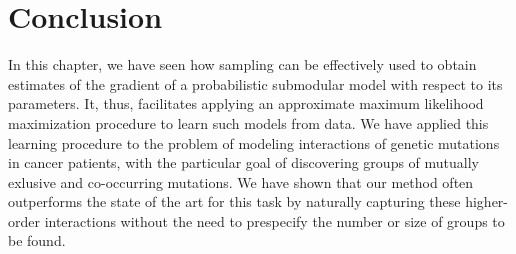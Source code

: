 \section{Conclusion}
In this chapter, we have seen how sampling can be effectively used to obtain estimates of the gradient of a probabilistic submodular model with respect to its parameters.
It, thus, facilitates applying an approximate maximum likelihood maximization procedure to learn such models from data.
We have applied this learning procedure to the problem of modeling interactions of genetic mutations in cancer patients, with the particular goal of discovering groups of mutually exlusive and co-occurring mutations.
We have shown that our method often outperforms the state of the art for this task by naturally capturing these higher-order interactions without the need to prespecify the number or size of groups to be found.